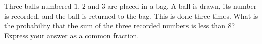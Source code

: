 Three balls numbered $1$, $2$ and $3$ are placed in a bag. A ball is drawn, its number is recorded, and the ball is returned to the bag. This is done three times. What is the probability that the sum of the three recorded numbers is less than $8$? Express your answer as a common fraction.
